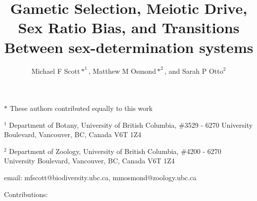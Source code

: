 \documentclass[12pt]{article}
\begin{document}
\title{Gametic Selection, Meiotic Drive, Sex Ratio Bias, and Transitions Between sex-determination systems}
\author{Michael F Scott$*^1$, Matthew M Osmond$*^2$, and Sarah P Otto$^2$}
\date{}
\maketitle
\noindent
$*$ These authors contributed equally to this work

\noindent
$^1$ Department of Botany, University of British Columbia, \#3529 - 6270 University Boulevard, Vancouver, BC, Canada V6T 1Z4

\noindent
$^2$ Department of Zoology, University of British Columbia, \#4200 - 6270 University Boulevard, Vancouver, BC, Canada V6T 1Z4

\noindent
email: mfscott@biodiversity.ubc.ca, mmosmond@zoology.ubc.ca

\noindent
Contributions: 

\newpage
\linenumbers
\modulolinenumbers[2]
\end{document}

